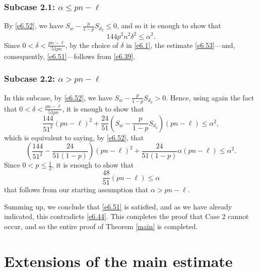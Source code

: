 \documentclass[10pt,a4paper]{amsart}
\theoremstyle{remark}
\newcommand{\mik}{\leqslant}
\begin{document}
\subsubsection*{Subcase 2.1: $\alpha\mik pn-\ell$} By \eqref{e6.52},
we have $S_w-\frac{p}{1-p}S_{d_2}\mik 0$, and so it is enough to show that
\begin{equation} \label{e6.53}
144p^2n^2\delta^2 \mik \alpha^2.
\end{equation}
Since $0<\delta<\frac{pn-\ell}{51pn}$, by the choice of $\delta$ in \eqref{e6.1},
the estimate \eqref{e6.53}---and, consequently, \eqref{e6.51}---follows from \eqref{e6.39}.

\subsubsection*{Subcase 2.2: $\alpha> pn-\ell$} In this subcase, by \eqref{e6.52}, we have $S_w-\frac{p}{1-p}S_{d_2}>0$.
Hence, using again the fact that $0<\delta<\frac{pn-\ell}{51pn}$, it is enough to show that
\begin{equation} \label{e6.54}
\frac{144}{51^2}(pn-\ell)^2 + \frac{24}{51}\left(S_w-\frac{p}{1-p}S_{d_2}\right)(pn-\ell)\mik \alpha^2,
\end{equation}
which is equivalent to saying, by \eqref{e6.52}, that
\begin{equation} \label{e6.55}
\left(\frac{144}{51^2}-\frac{24}{51(1-p)}\right) (pn-\ell)^2 + \frac{24}{51(1-p)}\alpha (pn-\ell)\mik \alpha^2.
\end{equation}
Since $0<p\mik \frac12$, it is enough to show that
\begin{equation} \label{e6.56}
\frac{48}{51} (pn-\ell)\mik \alpha
\end{equation}
that follows from our starting assumption that $\alpha>pn-\ell$.
\medskip

Summing up, we conclude that \eqref{e6.51} is satisfied, and as we have already indicated, this
contradicts \eqref{e6.44}. This completes the proof that Case 2 cannot occur, and so the entire
proof of Theorem \ref{main} is completed.


\section{Extensions of the main estimate} \label{sec7}

\end{document}
